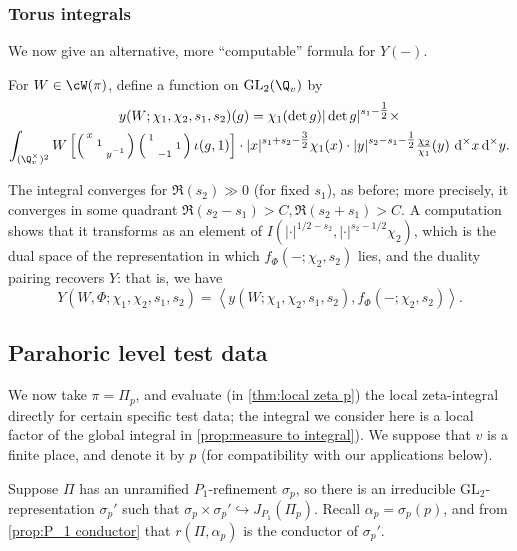 \documentclass[10pt,reqno,a4paper]{amsart}
\newcommand{\sdthree}[3]{\left(\begin{smallmatrix}#1 \\ & #2\\ && #3\end{smallmatrix}\right)}
\newcommand{\GL}{\mathrm{GL}}
\newcommand{\smallthreemat}[9]{\left(\begin{smallmatrix}
#1 & #2 & #3 \\
#4 & #5 & #6 \\
#7 & #8 & #9\end{smallmatrix}\right)}
\begin{document}
\subsubsection{Torus integrals} We now give an alternative, more ``computable'' formula for $Y(-)$.

\begin{definition}\label{def:y}
For $W \in \cW(\pi)$, define a function on $\GL_2(\Q_v)$ by
\begin{multline*}
	y(W; \chi_1, \chi_2, s_1, s_2)(g) = \chi_1(\det g)|\det g|^{s_1 - \tfrac{1}{2}} \times \\
	\int_{(\Q_v^\times)^2} W\left[\sdthree{x}{1}{y^{-1}}\smallthreemat{1}{}{} {}{}{1} {}{-1}{}\iota(g, 1)\right] \cdot |x|^{s_1 + s_2 - \tfrac{3}{2}} \chi_1(x)\cdot  |y|^{s_2 - s_1-\tfrac{1}{2}} \tfrac{\chi_2}{\chi_1}(y) \ \mathrm{d}^\times x\,  \mathrm{d}^\times y.\end{multline*}
\end{definition}

The integral converges for $\Re(s_2) \gg 0$ (for fixed $s_1$), as before; more precisely, it converges in some quadrant $\Re(s_2 - s_1) > C, \Re(s_2 + s_1) > C$. A computation shows that it transforms as an element of $I(|\cdot|^{1/2-s_2}, |\cdot|^{s_2 - 1/2} \chi_2)$, which is the dual space of the representation in which $f_{\Phi}(-;\chi_2, s_2)$ lies, and the duality pairing recovers $Y$: that is, we have
\begin{equation}\label{eq:Y and y}
Y(W, \Phi; \chi_1, \chi_2, s_1, s_2) = \left\langle y(W; \chi_1, \chi_2, s_1, s_2), f_{\Phi}(-;\chi_2, s_2)\right\rangle.
\end{equation}

\subsection{Parahoric level test data}\label{sec:test data at p}

We now take $\pi = \Pi_p$, and evaluate (in \cref{thm:local zeta p}) the local zeta-integral directly for certain specific test data; the integral we consider here is a local factor of the global integral in \cref{prop:measure to integral}). We suppose that $v$ is a finite place, and denote it by $p$ (for compatibility with our applications below).

Suppose $\Pi$ has an unramified $P_1$-refinement $\sigma_p$, so there is an irreducible $\GL_2$-representation $\sigma_p'$ such that $\sigma_p \times \sigma_p' \hookrightarrow J_{P_1}(\Pi_p)$. Recall $\alpha_p = \sigma_p(p)$, and from \cref{prop:P_1 conductor} that $r(\Pi,\alpha_p)$ is the conductor of $\sigma_p'$. 
\end{document}
